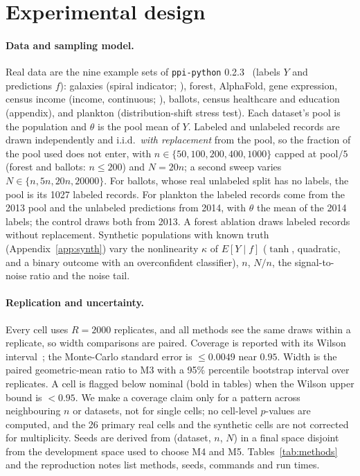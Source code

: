 \section{Experimental design}
\label{sec:design}
\paragraph{Data and sampling model.} Real data are the nine example sets of \texttt{ppi-python} 0.2.3~\citep{ppipython} (labels $Y$ and predictions $f$): galaxies (spiral indicator; \citealt{willett2013galaxyzoo2}), forest, AlphaFold, gene expression, census income (income, continuous; \citealt{ding2021retiring}), ballots, census healthcare and education (appendix), and plankton (distribution-shift stress test). Each dataset's pool is the population and $\theta$ is the pool mean of $Y$. Labeled and unlabeled records are drawn independently and i.i.d.\ \emph{with replacement} from the pool, so the fraction of the pool used does not enter, with $n\in\{50,100,200,400,1000\}$ capped at pool$/5$ (forest and ballots: $n\le200$) and $N=20n$; a second sweep varies $N\in\{n,5n,20n,20000\}$. For ballots, whose real unlabeled split has no labels, the pool is its 1027 labeled records. For plankton the labeled records come from the 2013 pool and the unlabeled predictions from 2014, with $\theta$ the mean of the 2014 labels; the control draws both from 2013. A forest ablation draws labeled records without replacement. Synthetic populations with known truth (Appendix~\ref{app:synth}) vary the nonlinearity $\kappa$ of $E[Y\mid f]$ ($\tanh$, quadratic, and a binary outcome with an overconfident classifier), $n$, $N/n$, the signal-to-noise ratio and the noise tail.

\paragraph{Replication and uncertainty.} Every cell uses $R=2000$ replicates, and all methods see the same draws within a replicate, so width comparisons are paired. Coverage is reported with its Wilson interval~\citep{wilson1927}; the Monte-Carlo standard error is $\le0.0049$ near $0.95$. Width is the paired geometric-mean ratio to M3 with a 95\% percentile bootstrap interval over replicates. A cell is flagged below nominal (bold in tables) when the Wilson upper bound is $<0.95$. We make a coverage claim only for a pattern across neighbouring $n$ or datasets, not for single cells; no cell-level $p$-values are computed, and the 26 primary real cells and the synthetic cells are not corrected for multiplicity. Seeds are derived from (dataset, $n$, $N$) in a final space disjoint from the development space used to choose M4 and M5. Tables~\ref{tab:methods} and the reproduction notes list methods, seeds, commands and run times.

